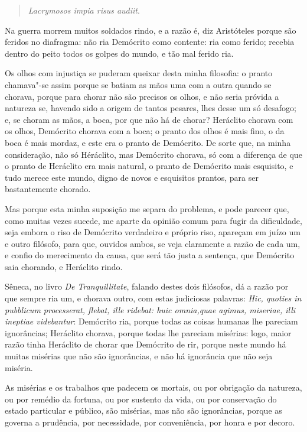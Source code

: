 \begin{verse}
\emph{Lacrymosos impia risus audiit}.
\end{verse}

Na guerra morrem muitos soldados rindo, e a razão é, diz Aristóteles
porque são feridos no diafragma: não ria Demócrito como contente: ria
como ferido; recebia dentro do peito todos os golpes do mundo, e tão mal
ferido ria.

Os olhos com injustiça se puderam queixar desta minha filosofia: o
pranto chamava"-se assim porque se batiam as mãos uma com a outra quando
se chorava, porque para chorar não são precisos os olhos, e não seria
próvida a natureza se, havendo sido a origem de tantos pesares, lhes
desse um só desafogo; e, se choram as mãos, a boca, por que não há de
chorar? Heráclito chorava com os olhos, Demócrito chorava com a boca; o
pranto dos olhos é mais fino, o da boca é mais mordaz, e este era o
pranto de Demócrito. De sorte que, na minha consideração, não só
Héráclito, mas Demócrito chorava, só com a diferença de que o pranto de
Heráclito era mais natural, o pranto de Demócrito mais esquisito, e tudo
merece este mundo, digno de novos e esquisitos prantos, para ser
bastantemente chorado.

Mas porque esta minha suposição me separa do problema, e pode parecer
que, como muitas vezes sucede, me aparte da opinião comum para fugir da
dificuldade, seja embora o riso de Demócrito verdadeiro e próprio riso,
apareçam em juízo um e outro filósofo, para que, ouvidos ambos, se veja
claramente a razão de cada um, e confio do merecimento da causa, que
será tão justa a sentença, que Demócrito saia chorando, e Heráclito
rindo.

Sêneca, no livro \emph{De Tranquillitate}, falando destes dois filósofos, dá a
razão por que sempre ria um, e chorava outro, com estas judiciosas
palavras: \emph{Hic, quoties in pubblicum processerat, flebat, ille
ridebat: huic omnia,quae agimus, miseriae, illi ineptiae videbantur}:
Demócrito ria, porque todas as coisas humanas lhe pareciam ignorâncias;
Heráclito chorava, porque todas lhe pareciam misérias: logo, maior razão
tinha Heráclito de chorar que Demócrito de rir, porque neste mundo há
muitas misérias que não são ignorâncias, e não há ignorância que não
seja miséria.

As misérias e os trabalhos que padecem os mortais, ou por obrigação da
natureza, ou por remédio da fortuna, ou por sustento da vida, ou por
conservação do estado particular e público, são misérias, mas não são
ignorâncias, porque as governa a prudência, por necessidade, por
conveniência, por honra e por decoro.

